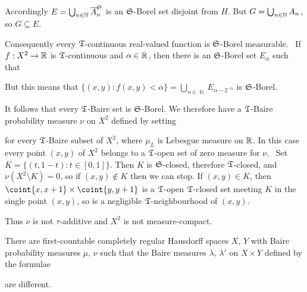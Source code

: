 {Accordingly $E=\bigcup_{n\in\Bbb N}\overline{A}_n^{\frak S}$ is an
$\frak S$-Borel set disjoint from $H$.   But $G=\bigcup_{n\in\Bbb
N}A_n$, so $G\subseteq E$.\ \Qed

\medskip

 Consequently every $\frak T$-continuous real-valued
function is $\frak S$-Borel measurable.   \Prf\ If $f:X^2\to\Bbb R$ is
$\frak T$-continuous and $\alpha\in\Bbb R$, then there is an
$\frak S$-Borel set $E_{\alpha}$ such that


\noindent But this means that
$\{(x,y):f(x,y)<\alpha\}=\bigcup_{n\in\BbbN}E_{\alpha-2^{-n}}$ is
$\frak S$-Borel.\ \Qed

\medskip

 It follows that every $\frak T$-Baire set is
$\frak S$-Borel.   We therefore have a $\frak T$-Baire probability
measure $\nu$ on $X^2$ defined by setting


\noindent for every $\frak T$-Baire subset of $X^2$, where $\mu_L$ is
Lebesgue measure on $\Bbb R$.   In this case
every point $(x,y)$ of $X^2$ belongs to a $\frak T$-open set of zero
measure for $\nu$.   \Prf\ Set $K=\{(t,1-t):t\in[0,1]\}$.   Then $K$ is
$\frak S$-closed, therefore $\frak T$-closed, and $\nu(X^2\setminus
K)=0$, so if $(x,y)\notin K$ then we can stop.   If $(x,y)\in K$, then
$\coint{x,x+1}\times\coint{y,y+1}$ is a $\frak T$-open $\frak T$-closed
set meeting $K$
in the single point $(x,y)$, so is a negligible $\frak T$-neighbourhood
of $(x,y)$.\ \Qed

Thus $\nu$ is not $\tau$-additive and $X^2$ is not measure-compact.
}%


 There are first-countable completely regular
Hausdorff spaces $X$, $Y$ with Baire probability measures $\mu$, $\nu$
such that the Baire measures $\lambda$, $\lambda'$ on $X\times Y$
defined by the formulae


\noindent{}are different.

